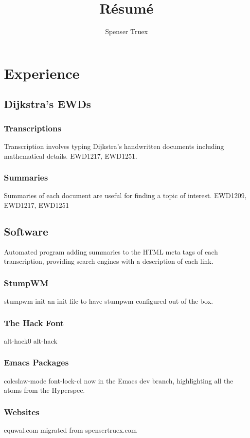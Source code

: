 


\title{R\'esum\'e}
\author{Spenser Truex}

\maketitle

\section{Experience}
\subsection{Dijkstra's EWDs}
\subsubsection{Transcriptions}
Transcription involves typing Dijkstra's handwritten documents including mathematical details. EWD1217, EWD1251.
\subsubsection{Summaries}
Summaries of each document are useful for finding a topic of interest.
EWD1209, EWD1217, EWD1251
\subsection{Software}
Automated program adding summaries to the HTML meta tags of each transcription, providing search engines with a description of each link.
\subsubsection{StumpWM}
stumpwm-init an init file to have stumpwm configured out of the box.
\subsubsection{The Hack Font}
alt-hack0
alt-hack
\subsubsection{Emacs Packages}
coleslaw-mode
font-lock-cl now in the Emacs dev branch, highlighting all the atoms from the Hyperspec.
\subsubsection{Websites}
equwal.com migrated from spensertruex.com
